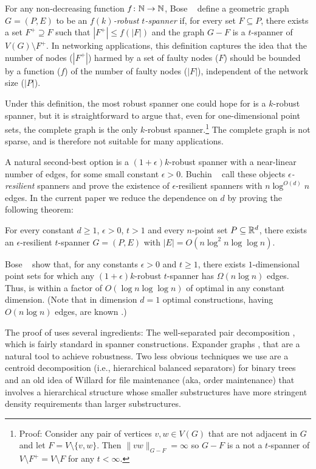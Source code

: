 \documentclass{patmorin}
\begin{document}
For any non-decreasing function $f\colon\mathbb{N}\to\mathbb{N}$, Bose \etal\
\cite{bose.dujmovic.ea:robust} define a geometric graph $G=(P,E)$ to be an
\emph{$f(k)$-robust $t$-spanner} if, for every set $F\subseteq P$,
there exists a set $F^+\supseteq F$ such that $|F^+|\le f(|F|)$ and
the graph $G-F$ is a $t$-spanner of $V(G)\setminus F^+$.  In networking
applications, this definition captures the idea that the number
of nodes ($|F^+|$) harmed by a set of faulty nodes ($F$) should be bounded by a function
($f$) of the number of faulty nodes ($|F|$), independent of the network
size ($|P|$).

Under this definition, the most robust spanner one could hope for
is a $k$-robust spanner, but it is straightforward to argue
that, even for one-dimensional point sets, the complete graph is the
only $k$-robust spanner.\footnote{Proof: Consider any pair of vertices
$v,w\in V(G)$ that are not adjacent in $G$ and let $F=V\setminus\{v,w\}$.
Then $\|vw\|_{G-F}=\infty$ so $G-F$ is a not a $t$-spanner of $V\setminus
F^+=V\setminus F$ for any $t<\infty$.} The complete graph is not sparse,
and is therefore not suitable for many applications.

A natural second-best option is a $(1+\epsilon)k$-robust spanner with
a near-linear number of edges, for some small constant $\epsilon >0$.
Buchin \etal\ \cite{buchin.har-peled.ea:spanner} call these objects
\emph{$\epsilon$-resilient} spanners and prove the existence of
$\epsilon$-resilient spanners with $n\log^{O(d)} n$ edges.
In the current paper we reduce the dependence on $d$ by proving the
following theorem:

\begin{thm}
  For every constant $d\ge 1$, $\epsilon>0$, $t>1$ and every $n$-point
  set $P\subseteq\mathbb{R}^d$, there exists an $\epsilon$-resilient $t$-spanner
  $G=(P,E)$ with $|E|=O(n\log^2 n\log\log n)$.
\end{thm}

Bose \etal\ \cite{bose.dujmovic.ea:robust} show that, for any constants
$\epsilon>0$ and $t\ge 1$, there exists $1$-dimensional point sets
for which any $(1+\epsilon)k$-robust $t$-spanner has $\Omega(n\log
n)$ edges.  Thus, \thmref{main-i} is within a factor of $O(\log
n\log\log n)$ of optimal in any constant dimension.  (Note that in
dimension $d=1$ optimal constructions, having $O(n\log n)$ edges, are
known \cite{buchin.har-peled.ea:spanner}.)

The proof of  uses several ingredients: The well-separated
pair decomposition \cite{callahan.kosaraju:decomposition}, which
is fairly standard in spanner constructions.  Expander graphs
\cite{hoory.linial.ea:expanders}, that are a natural tool to
achieve robustness. Two less obvious techniques we use are a centroid
decomposition (i.e., hierarchical balanced separators) for binary trees
and an old idea of Willard \cite{willard:maintaining} for file maintenance
(aka, order maintenance) that involves a hierarchical structure whose
smaller substructures have more stringent density requirements than
larger substructures.
\end{document}
